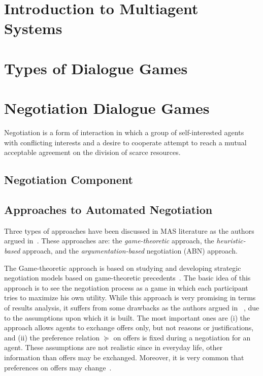 \setcounter{chapter}{2}

\section{Introduction to Multiagent Systems}\label{sec:MAS}





\section{Types of Dialogue Games}\label{sec:DialogueGames}






\section{Negotiation Dialogue Games}\label{sec:Negotiation}
Negotiation is a form of interaction in which a group of self-interested agents with conflicting interests and a desire to cooperate attempt to 
reach  a mutual acceptable agreement on the division of scarce resources.



   \subsection{Negotiation Component}\label{sec:NComp}
   



   \subsection{Approaches to Automated Negotiation}\label{sec:Nappro}

Three types of approaches have been discussed in MAS literature as the authors argued in~\cite{JenningsPASC01}. These approaches are:
the \textit{game-theoretic} approach, the \textit{heuristic-based} approach, and the \textit{argumentation-based} negotiation (ABN)
approach.

The Game-theoretic approach is based on studying and developing strategic negotiation models based on game-theoretic precedents~\cite{Neumann44,JeffreyG94}.
The basic idea of this approach is to see the negotiation process as a game in which each participant tries to maximize his own utility. While this approach
is very promising in terms of results analysis, it suffers from some drawbacks as the authors argued in ~\cite{AmgoudV11}, due to the assumptions upon which
it is built. The most important ones are (i) the approach allows agents to exchange offers only, but not reasons or justifications, and (ii) the preference relation
$\succeq$ on offers is fixed during a negotiation for an agent. These assumptions are not realistic since in everyday life, other information than offers may be exchanged.
Moreover, it is very common that preferences on offers may change~\cite{AmgoudV11}.

